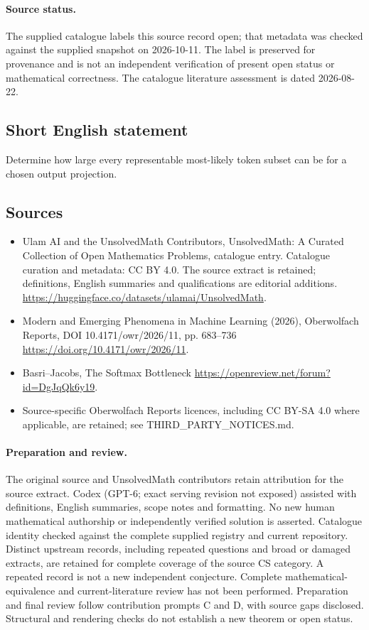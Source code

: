 \documentclass[11pt]{article}
\begin{document}
\paragraph{Source status.}
The supplied catalogue labels this source record open; that metadata was checked against the supplied snapshot on 2026-10-11. The label is preserved for provenance and is not an independent verification of present open status or mathematical correctness. The catalogue literature assessment is dated 2026-08-22.
\subsection{Short English statement}
Determine how large every representable most-likely token subset can be for a chosen output projection.
\subsection{Sources}
\begin{itemize}
\item[\hypertarget{source:statement:1}{S1}] Ulam AI and the UnsolvedMath Contributors, UnsolvedMath: A Curated Collection of Open Mathematics Problems, catalogue entry. Catalogue curation and metadata: CC BY 4.0. The source extract is retained; definitions, English summaries and qualifications are editorial additions.
\url{https://huggingface.co/datasets/ulamai/UnsolvedMath}.
\item[\hypertarget{source:statement:2}{S2}] Modern and Emerging Phenomena in Machine Learning (2026), Oberwolfach Reports, DOI 10.4171/owr/2026/11, pp. 683--736
\url{https://doi.org/10.4171/owr/2026/11}.
\item[\hypertarget{source:statement:3}{S3}] Basri--Jacobs, The Softmax Bottleneck
\url{https://openreview.net/forum?id=DgJqQk6y19}.
\item Source-specific Oberwolfach Reports licences, including CC BY-SA 4.0 where applicable, are retained; see THIRD\_PARTY\_NOTICES.md.
\end{itemize}
\paragraph{Preparation and review.}
The original source and UnsolvedMath contributors retain attribution for the source extract. Codex (GPT-6; exact serving revision not exposed) assisted with definitions, English summaries, scope notes and formatting. No new human mathematical authorship or independently verified solution is asserted. Catalogue identity checked against the complete supplied registry and current repository. Distinct upstream records, including repeated questions and broad or damaged extracts, are retained for complete coverage of the source CS category. A repeated record is not a new independent conjecture. Complete mathematical-equivalence and current-literature review has not been performed. Preparation and final review follow contribution prompts C and D, with source gaps disclosed. Structural and rendering checks do not establish a new theorem or open status.
\label{end:statement}
\end{document}
